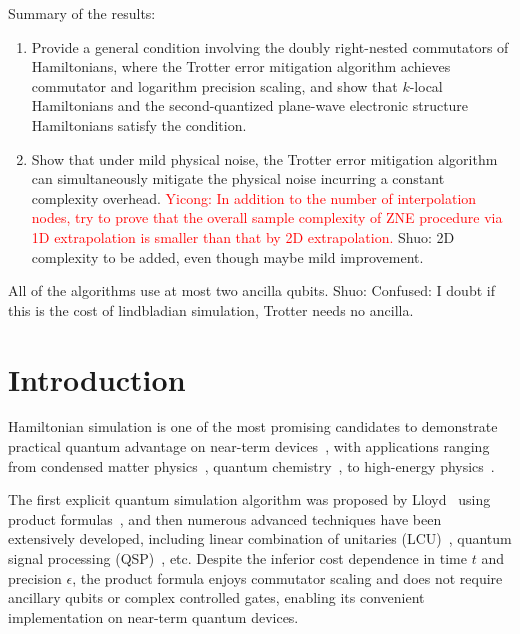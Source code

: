 \documentclass[aps,pra,reprint,groupedaddress,floatfix]{revtex4-2}
\newcommand{\mc}{\mathcal}
\newcommand{\sz}[1]{{\color{blue} Shuo: #1}}
\begin{document}
Summary of the results: 
\begin{enumerate}
    \item Provide a general condition involving the doubly right-nested commutators of Hamiltonians, where the Trotter error mitigation algorithm \cite{watson2025exponentially} achieves commutator and logarithm precision scaling, and show that $k$-local Hamiltonians and the second-quantized plane-wave electronic structure Hamiltonians satisfy the condition.
    \item Show that under mild physical noise, the Trotter error mitigation algorithm can simultaneously mitigate the physical noise incurring a constant complexity overhead. \textcolor{red}{Yicong: In addition to the number of interpolation nodes, try to prove that the overall sample complexity of ZNE procedure via 1D extrapolation is smaller than that by 2D extrapolation.} \sz{2D complexity to be added, even though maybe mild improvement.}
\end{enumerate}
All of the algorithms use at most two ancilla qubits. \sz{Confused: I doubt if this is the cost of lindbladian simulation, Trotter needs no ancilla.} 

\section{Introduction}
Hamiltonian simulation is one of the most promising candidates to demonstrate practical quantum advantage on near-term devices~\cite{kim2023evidence}, with applications ranging from condensed matter physics~\cite{childs2018toward}, quantum chemistry~\cite{mcardle2020quantum}, to high-energy physics~\cite{bauer2023quantum}.

The first explicit quantum simulation algorithm was proposed by Lloyd~\cite{doi:10.1126/science.273.5278.1073} using product formulas~\cite{suzuki1985decomposition,suzuki1991general}, and then numerous advanced techniques have been extensively developed, including linear combination of unitaries (LCU)~\cite{childs2012hamiltonian, dominic_w_berry_simulating_2015}, quantum signal processing (QSP)~\cite{Low_2017, low2019hamiltonian}, etc. Despite the inferior cost dependence in time $t$ and precision $\epsilon$, the product formula enjoys commutator scaling and does not require ancillary qubits or complex controlled gates, enabling its convenient implementation on near-term quantum devices.
\end{document}

